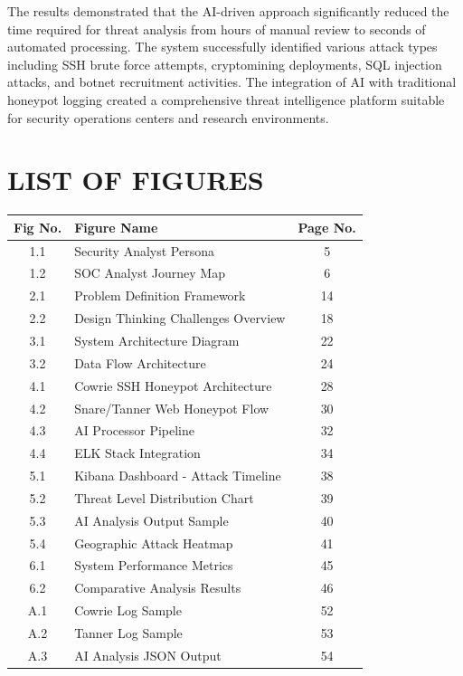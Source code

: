 \documentclass[12pt,a4paper]{report}
\begin{document}
The results demonstrated that the AI-driven approach significantly reduced the time required for threat analysis from hours of manual review to seconds of automated processing. The system successfully identified various attack types including SSH brute force attempts, cryptomining deployments, SQL injection attacks, and botnet recruitment activities. The integration of AI with traditional honeypot logging created a comprehensive threat intelligence platform suitable for security operations centers and research environments.

\newpage

\tableofcontents
\newpage

\chapter*{LIST OF FIGURES}
\thispagestyle{plain}

\begin{center}
\begin{tabular}{|c|p{9cm}|c|}
\hline
\textbf{Fig No.} & \textbf{Figure Name} & \textbf{Page No.} \\
\hline
1.1 & Security Analyst Persona & 5 \\
\hline
1.2 & SOC Analyst Journey Map & 6 \\
\hline
2.1 & Problem Definition Framework & 14 \\
\hline
2.2 & Design Thinking Challenges Overview & 18 \\
\hline
3.1 & System Architecture Diagram & 22 \\
\hline
3.2 & Data Flow Architecture & 24 \\
\hline
4.1 & Cowrie SSH Honeypot Architecture & 28 \\
\hline
4.2 & Snare/Tanner Web Honeypot Flow & 30 \\
\hline
4.3 & AI Processor Pipeline & 32 \\
\hline
4.4 & ELK Stack Integration & 34 \\
\hline
5.1 & Kibana Dashboard - Attack Timeline & 38 \\
\hline
5.2 & Threat Level Distribution Chart & 39 \\
\hline
5.3 & AI Analysis Output Sample & 40 \\
\hline
5.4 & Geographic Attack Heatmap & 41 \\
\hline
6.1 & System Performance Metrics & 45 \\
\hline
6.2 & Comparative Analysis Results & 46 \\
\hline
A.1 & Cowrie Log Sample & 52 \\
\hline
A.2 & Tanner Log Sample & 53 \\
\hline
A.3 & AI Analysis JSON Output & 54 \\
\hline
\end{tabular}
\end{center}
\end{document}
